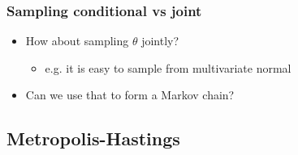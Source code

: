 \documentclass[10pt]{beamer}
\begin{document}
\begin{frame}

\frametitle{Sampling conditional vs joint}

  \begin{itemize}
  \item How about sampling $\theta$ jointly?
    \begin{itemize}
    \item e.g. it is easy to sample from multivariate normal
    \end{itemize}
    \item<2-> Can we use that to form a Markov chain?
  \end{itemize}

\end{frame}

\subsection{Metropolis-Hastings}
\frame{\subsectionpage}
\end{document}
